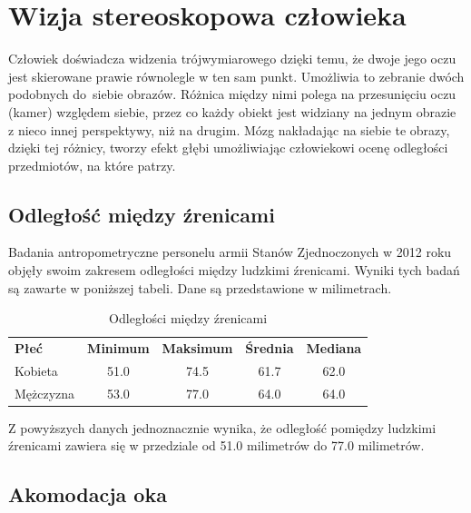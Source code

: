 \documentclass[a4paper,11pt,twoside]{report}
\theoremstyle{definition}
\begin{document}
\section{Wizja stereoskopowa człowieka}

Człowiek doświadcza widzenia trójwymiarowego dzięki temu, że dwoje jego oczu jest skierowane prawie równolegle w ten sam punkt. Umożliwia to zebranie dwóch podobnych do~siebie obrazów. Różnica między nimi polega na przesunięciu oczu (kamer) względem siebie, przez co każdy obiekt jest widziany na jednym obrazie z nieco innej perspektywy, niż na drugim. Mózg nakładając na siebie te obrazy, dzięki tej różnicy, tworzy efekt głębi umożliwiając człowiekowi ocenę odległości przedmiotów, na które patrzy.

\subsection{Odległość między źrenicami}

Badania antropometryczne personelu armii Stanów Zjednoczonych w 2012 roku\cite{IPdistance} objęły swoim zakresem odległości między ludzkimi źrenicami. Wyniki tych badań są zawarte w poniższej tabeli. Dane są przedstawione w milimetrach.

\begin{table}[h!]
\centering
\label{my-label}
\begin{tabular}{lcccc}
\textbf{Płeć} & \multicolumn{1}{l}{\textbf{Minimum}} & \multicolumn{1}{l}{\textbf{Maksimum}} & \multicolumn{1}{l}{\textbf{Średnia}} & \multicolumn{1}{l}{\textbf{Mediana}} \\
Kobieta       & 51.0                                 & 74.5                                  & 61.7                                 & 62.0                                 \\
Mężczyzna     & 53.0                                 & 77.0                                  & 64.0                                 & 64.0                                
\end{tabular}
\caption{Odległości między źrenicami}
\end{table}

Z powyższych danych jednoznacznie wynika, że odległość pomiędzy ludzkimi źrenicami zawiera się w przedziale od 51.0 milimetrów do 77.0 milimetrów.

\subsection{Akomodacja oka}
\end{document}
